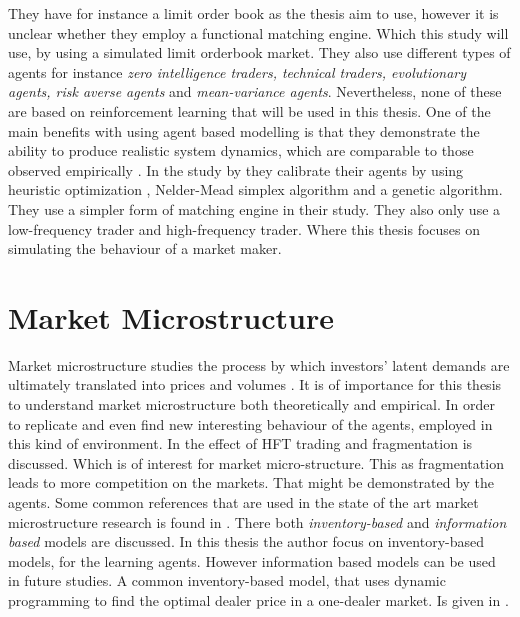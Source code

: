 \documentclass{kththesis}
\theoremstyle{definition}
\begin{document}
\newline
\newline
They have for instance a limit order book as the thesis aim to use, however it is unclear whether they employ a functional matching engine. Which this study will use, by using a simulated limit orderbook market. They also use different types of agents for instance \textit{zero intelligence traders, technical traders, evolutionary agents, risk averse agents} and \textit{mean-variance agents}. Nevertheless, none of these are based on reinforcement learning that will be used in this thesis. 
\newline
\newline
One of the main benefits with using agent based modelling is that they demonstrate the ability to produce realistic system dynamics, which are comparable to those observed empirically \parencite{platt2016problem}. In the study by \textcite{platt2016problem} they calibrate their agents by using heuristic optimization , Nelder-Mead simplex algorithm and a genetic algorithm. They use a simpler form of matching engine in their study. They also only use a low-frequency trader and high-frequency trader. Where this thesis focuses on simulating the behaviour of a market maker.

\section{Market Microstructure}
Market microstructure studies the process by which investors' latent demands are ultimately translated into prices and volumes \parencite{madhavan2000market}. It is of importance for this thesis to understand market microstructure both theoretically and empirical. In order to replicate and even find new interesting behaviour of the agents, employed in this kind of environment. In \textcite{haferkorn2017high, agarwal2012high} the effect of HFT trading and fragmentation is discussed. Which is of interest for market micro-structure. This as fragmentation leads to more competition on the markets. That might be demonstrated by the agents. Some common references that are used in the state of the art market microstructure research is found in \parencite{o1995market,hasbrouck2007empirical, madhavan2000market, madhavan2002market}. 
\newline
\newline
There both \textit{inventory-based} and \textit{information based} models are discussed. In this thesis the author focus on inventory-based models, for the learning agents. However information based models can be used in future studies. A common inventory-based model, that uses dynamic programming to find the optimal dealer price in a one-dealer market. Is given in \textcite{ho1981optimal}. 
\newpage
\end{document}
